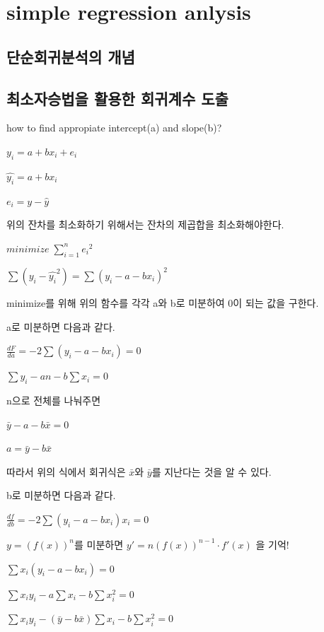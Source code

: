 \documentclass[
]{book}
\begin{document}
\section{simple regression anlysis}\label{simple-regression-anlysis-1}

\subsection{단순회귀분석의 개념}\label{uxb2e8uxc21cuxd68cuxadc0uxbd84uxc11duxc758-uxac1cuxb150-1}

\subsection{최소자승법을 활용한 회귀계수 도출}\label{uxcd5cuxc18cuxc790uxc2b9uxbc95uxc744-uxd65cuxc6a9uxd55c-uxd68cuxadc0uxacc4uxc218-uxb3c4uxcd9c-1}

how to find appropiate intercept(a) and slope(b)?

\(y_{i}=a+bx_{i}+e_{i}\)

\(\hat{y_{i}}=a+bx_{i}\)

\(e_{i}=y-\hat{y}\)

위의 잔차를 최소화하기 위해서는 잔차의 제곱합을 최소화해야한다.

\(minimize\; \sum_{i=1}^{n}{e_{i}}^2\)

\(\sum(y_{i}-\hat{y_{i}}^2)=\sum(y_{i}-a-bx_{i})^2\)

minimize를 위해 위의 함수를 각각 a와 b로 미분하여 0이 되는 값을 구한다.

a로 미분하면 다음과 같다.

\(\frac{dF}{da}=-2\sum(y_{i}-a-bx_{i})=0\)

\(\sum y_{i}-an-b \sum x_{i}=0\)

n으로 전체를 나눠주면

\(\bar{y}-a-b\bar{x}=0\)

\(a=\bar{y}-b\bar{x}\)

따라서 위의 식에서 회귀식은 \(\bar{x}\)와 \(\bar{y}\)를 지난다는 것을 알 수 있다.

b로 미분하면 다음과 같다.

\(\frac{df}{db}=-2\sum (y_{i}-a-bx_{i})x_{i}=0\)

\(y=(f(x))^n\)를 미분하면 \({y}'=n({f(x)})^{n-1}\cdot {f}'(x)\) 을 기억!

\(\sum x_{i}(y_{i}-a-bx_{i})=0\)

\(\sum x_{i}y_{i}-a\sum x_{i} - b\sum x_{i}^2 =0\)

\(\sum x_{i}y_{i}-(\bar{y}-b\bar{x})\sum x_{i} - b\sum x_{i}^2 =0\)
\end{document}
